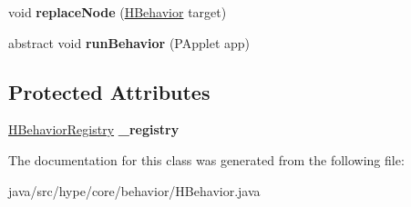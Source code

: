 \begin{DoxyCompactItemize}
\item 
\hypertarget{classhype_1_1core_1_1behavior_1_1_h_behavior_a6c33a17493fa1b4aa3592fdbb36cb9f1}{void {\bfseries replace\-Node} (\hyperlink{classhype_1_1core_1_1behavior_1_1_h_behavior}{H\-Behavior} target)}\label{classhype_1_1core_1_1behavior_1_1_h_behavior_a6c33a17493fa1b4aa3592fdbb36cb9f1}

\item 
\hypertarget{classhype_1_1core_1_1behavior_1_1_h_behavior_ae2c4b6bdbe6422f0684247162d55782e}{abstract void {\bfseries run\-Behavior} (P\-Applet app)}\label{classhype_1_1core_1_1behavior_1_1_h_behavior_ae2c4b6bdbe6422f0684247162d55782e}

\end{DoxyCompactItemize}
\subsection*{Protected Attributes}
\begin{DoxyCompactItemize}
\item 
\hypertarget{classhype_1_1core_1_1behavior_1_1_h_behavior_a75eff7e938caf70a6771c91755a9d7e9}{\hyperlink{classhype_1_1core_1_1behavior_1_1_h_behavior_registry}{H\-Behavior\-Registry} {\bfseries \-\_\-registry}}\label{classhype_1_1core_1_1behavior_1_1_h_behavior_a75eff7e938caf70a6771c91755a9d7e9}

\end{DoxyCompactItemize}


The documentation for this class was generated from the following file\-:\begin{DoxyCompactItemize}
\item 
java/src/hype/core/behavior/H\-Behavior.\-java\end{DoxyCompactItemize}
